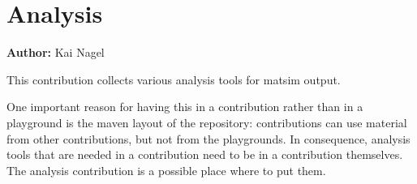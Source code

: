 \chapter{Analysis}
\label{sec:contrib-analysis}

\hfill \textbf{Author:} Kai Nagel





This \gls{contribution} collects various analysis tools for \gls{matsim} output.  

One important reason for having this in a \gls{contribution} rather than in a playground is the \gls{maven} layout of the repository: \Glspl{contribution} can use material from other \glspl{contribution}, but not from the playgrounds. 
In consequence, analysis tools that are needed in a \gls{contribution} need to be in a \gls{contribution} themselves. 
The analysis \gls{contribution} is a possible place where to put them.
